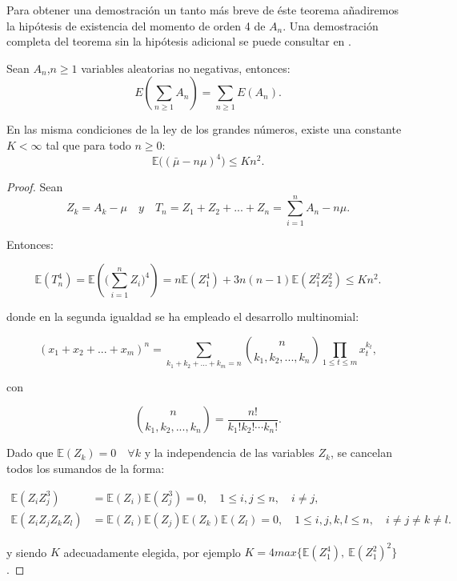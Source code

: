 \documentclass[../proyecto.tex]{memoir}
\begin{document}
Para obtener una demostración un tanto más breve de éste teorema añadiremos la hipótesis de existencia del momento de orden 4 de $A_n$. Una demostración completa del teorema sin la hipótesis adicional se puede consultar en \cite{elLibro}.

\begin{lema}  \label{intercambio_suma}
Sean $A_n$,$ n \geq 1$ variables aleatorias no negativas, entonces: $$
E \left( \sum_{n \geq 1} A_n \right) = \sum_{n \geq 1} E(A_n).
$$

\end{lema}

\begin{lema}
En las misma condiciones de la ley de los grandes números, existe una constante $ K < \infty $ tal que para todo $ n \geq 0$:
$$
\mathds{E} \big( ( \bar{ \mu } - n \mu ) ^ 4 \big) \leq K n^2.
$$
\end{lema}

\begin{proof}

Sean 
$$
Z_k = A_k - \mu \quad y \quad T_n = Z_1 + Z_2 + ... + Z_n = \sum_{i=1}^{n} A_n - n\mu. 
$$

Entonces:

$$
\mathds{E} ( T_{n}^{4} ) = \mathds{E} ( \big( \sum_{i=1}^{n} Z_i \big) ^{4} ) = n\mathds{E}(Z_{1}^4)+3n(n-1)\mathds{E}(Z_1^2 Z_2^2) \leq Kn^2.
$$

donde en la segunda igualdad se ha empleado el desarrollo multinomial:

$$
(x_1+x_2+...+x_m)^n = \sum_{k_1+k_2+...+k_m=n} { n \choose k_1,k_2, ..., k_n} \prod_{1 \leq t \leq m} x_t^{k_t},
$$

con

$$
{ n \choose k_1,k_2, ..., k_n} = \frac{n!}{k_1!k_2! \dotsb k_n!}.
$$

Dado que $\mathds{E}(Z_k)=0 \quad \forall k$ y la independencia de las variables $Z_k$, se cancelan todos los sumandos de la forma:

\begin{align*}
	\mathds{E} (Z_{i} Z_{j}^3 ) &=\mathds{E} (Z_{i}) \mathds{E} (Z_{j}^3) = 0, \quad 1 \leq i,j \leq n, \quad i \neq j, \\
	\mathds{E} ( Z_{i} Z_{j} Z_{k} Z_{l} ) &= \mathds{E} (Z_{i}) \mathds{E} (Z_{j}) \mathds{E} (Z_{k}) \mathds{E} (Z_{l}) = 0, \quad 1 \leq i,j,k,l \leq n, \quad i \neq j \neq k \neq l.
\end{align*}

y siendo $K$ adecuadamente elegida, por ejemplo $K = 4 max\{\mathds{E}(Z_1^4),\ \mathds{E}(Z_1^2)^2\}$.
\end{proof}
\end{document}
